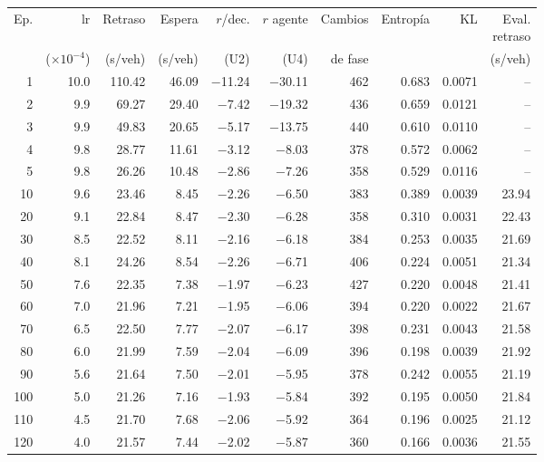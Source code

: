 \begin{table}[H]
\centering
\scriptsize
\setlength{\tabcolsep}{3pt}
\setlength{\tabcolsep}{2pt}
\begin{tabular}{rrrrrrrrrr}
\toprule
Ep. & lr & Retraso & Espera & $r$/dec. & $r$ agente & Cambios & Entropía & KL & \makecell{Eval.\\retraso} \\
 & ($\times 10^{-4}$) & (s/veh) & (s/veh) & (U2) & (U4) & de fase &  &  & (s/veh) \\
\midrule
1 & 10.0 & 110.42 & 46.09 & $-$11.24 & $-$30.11 & 462 & 0.683 & 0.0071 & -- \\
2 & 9.9 & 69.27 & 29.40 & $-$7.42 & $-$19.32 & 436 & 0.659 & 0.0121 & -- \\
3 & 9.9 & 49.83 & 20.65 & $-$5.17 & $-$13.75 & 440 & 0.610 & 0.0110 & -- \\
4 & 9.8 & 28.77 & 11.61 & $-$3.12 & $-$8.03 & 378 & 0.572 & 0.0062 & -- \\
5 & 9.8 & 26.26 & 10.48 & $-$2.86 & $-$7.26 & 358 & 0.529 & 0.0116 & -- \\
10 & 9.6 & 23.46 & 8.45 & $-$2.26 & $-$6.50 & 383 & 0.389 & 0.0039 & 23.94 \\
20 & 9.1 & 22.84 & 8.47 & $-$2.30 & $-$6.28 & 358 & 0.310 & 0.0031 & 22.43 \\
30 & 8.5 & 22.52 & 8.11 & $-$2.16 & $-$6.18 & 384 & 0.253 & 0.0035 & 21.69 \\
40 & 8.1 & 24.26 & 8.54 & $-$2.26 & $-$6.71 & 406 & 0.224 & 0.0051 & 21.34 \\
50 & 7.6 & 22.35 & 7.38 & $-$1.97 & $-$6.23 & 427 & 0.220 & 0.0048 & 21.41 \\
60 & 7.0 & 21.96 & 7.21 & $-$1.95 & $-$6.06 & 394 & 0.220 & 0.0022 & 21.67 \\
70 & 6.5 & 22.50 & 7.77 & $-$2.07 & $-$6.17 & 398 & 0.231 & 0.0043 & 21.58 \\
80 & 6.0 & 21.99 & 7.59 & $-$2.04 & $-$6.09 & 396 & 0.198 & 0.0039 & 21.92 \\
90 & 5.6 & 21.64 & 7.50 & $-$2.01 & $-$5.95 & 378 & 0.242 & 0.0055 & 21.19 \\
100 & 5.0 & 21.26 & 7.16 & $-$1.93 & $-$5.84 & 392 & 0.195 & 0.0050 & 21.84 \\
110 & 4.5 & 21.70 & 7.68 & $-$2.06 & $-$5.92 & 364 & 0.196 & 0.0025 & 21.12 \\
120 & 4.0 & 21.57 & 7.44 & $-$2.02 & $-$5.87 & 360 & 0.166 & 0.0036 & 21.55 \\

\end{tabular}
\end{table}
